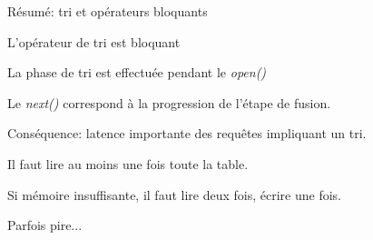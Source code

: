 \documentclass[aspectratio=169, handout]{beamer} %
\begin{document}
\begin{frame}[fragile]{Résumé: tri et opérateurs bloquants}

L'opérateur de tri est \alert{bloquant}

\vfill

\begin{redbullet}
  \item La phase de tri est effectuée pendant le \textit{open()}
  \item Le \textit{next()} correspond à la progression de l'étape de fusion.
\end{redbullet}

\vfill

Conséquence: \alert{latence importante des requêtes impliquant un tri.}

\vfill
\begin{blocgauche}
\begin{redbullet}
  \item Il faut lire \alert{au moins une fois} toute la table.
  \item Si mémoire insuffisante, il faut lire deux fois, écrire une fois.
  \item Parfois pire...
\end{redbullet}
\end{blocgauche}
\vfill



\end{frame}
\end{document}
